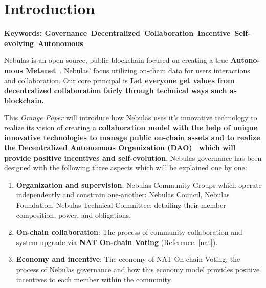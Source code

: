 
\section{Introduction}

\textbf{Keywords: Governance\ Decentralized\ Collaboration\ Incentive\ Self-evolving\ Autonomous }

\vspace{2em}

Nebulas is an open-source, public blockchain focused on creating a true
\textbf{Autono-mous Metanet}~\cite{AutonomousMetanet}. Nebulas' focus utilizing on-chain data for users interactions and collaboration. Our core principal is \textbf{Let everyone get values from decentralized collaboration fairly through technical ways such as blockchain.}~\cite{vision}

This \textit{Orange Paper} will introduce how Nebulas uses it's innovative technology to realize its vision of creating a \textbf{collaboration model with the help of unique innovative technologies to manage public on-chain assets and to realize the Decentralized Autonomous Organization (DAO)~\cite{DAO} which will provide positive incentives and self-evolution}. Nebulas governance has been designed with the following three aspects which will be explained one by one:

\begin{enumerate}
	\item \textbf{Organization and supervision}:
	Nebulas Community Groups which operate independently and constrain one-another: Nebulas Council, Nebulas Foundation, Nebulas Technical Committee; detailing their member composition, power, and obligations.
	\item \textbf{On-chain collaboration}:
	The process of community collaboration and system upgrade via \textbf{NAT On-chain Voting} (Reference: \ref{nat}).
	\item \textbf{Economy and incentive}:
	The economy of NAT On-chain Voting, the process of Nebulas governance and how this economy model provides positive incentives to each member within the community.
\end{enumerate}

